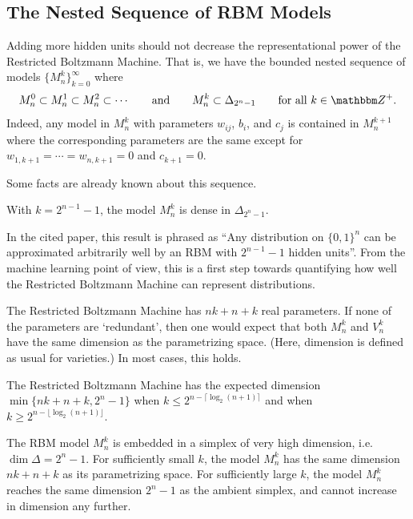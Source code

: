 \documentclass[11pt,titlepage]{article}
\numberwithin{equation}{section}
\begin{document}
\subsection{The Nested Sequence of RBM Models}

    Adding more hidden units should not decrease the representational power of
    the Restricted Boltzmann Machine.  That is, we have the bounded nested
    sequence of models $\{M_n^k\}_{k=0}^\infty$ where
    \[
        M_n^0 \subset M_n^1 \subset M_n^2 \subset \cdots 
        \qquad\text{and}\qquad
        M_n^k \subset \Delta_{2^n-1}
        \qquad\text{for all $k \in \Z^+$}.
    \]
    Indeed, any model in $M_n^k$ with parameters $w_{ij}$, $b_i$, and $c_j$ is
    contained in $M_n^{k+1}$ where the corresponding parameters are the same
    except for $w_{1,k+1} = \cdots = w_{n, k+1} = 0$  and $c_{k+1} = 0$.

    Some facts are already known about this sequence.
    \begin{theorem}[\cite{MA10}] \label{thm:approximator}
    With $k = 2^{n-1} - 1$, the model $M_n^k$ is dense in $\Delta_{2^n - 1}$.
    \end{theorem}
    In the cited paper, this result is phrased as ``Any distribution on
    $\{0,1\}^n$ can be approximated arbitrarily well by an RBM with $2^{n-1} -
    1$ hidden units''.  From the machine learning point of view, this is a first
    step towards quantifying how well the Restricted Boltzmann Machine can
    represent distributions.

    The Restricted Boltzmann Machine has $nk+n+k$ real parameters.  If none of
    the parameters are `redundant', then one would expect that both $M_n^k$ and
    $V_n^k$ have the same dimension as the parametrizing space.  (Here,
    dimension is defined as usual for varieties.) In most cases, this holds.
    \begin{theorem} \label{thm:dimension}
    The Restricted Boltzmann Machine has the expected dimension
    $\min\{nk+n+k, 2^n-1\}$ when $k \le 2^{n-\lceil \log_2(n+1)\rceil}$ and
    when $k \ge 2^{n-\lfloor\log_2(n+1)\rfloor}$.
    \end{theorem}
    \noindent The RBM model $M_n^k$ is embedded in a simplex of very high
    dimension, i.e. $\dim \Delta = 2^n-1$.  For sufficiently small $k$, the
    model $M_n^k$ has the same dimension $nk+n+k$ as its parametrizing space.
    For sufficiently large $k$, the model $M_n^k$ reaches the same dimension
    $2^n-1$ as the ambient simplex, and cannot increase in dimension any
    further.
\end{document}
